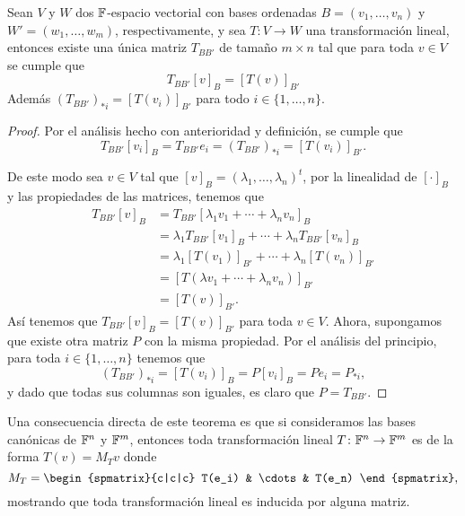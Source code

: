 \begin{teor} \label{teor:MatTrLin}
  Sean $V$ y $W$ dos $\mathbb{F}$-espacio vectorial con bases ordenadas $B = (v_1,\ldots,v_n)$ y $W' = (w_1,\ldots,w_m)$, respectivamente, y sea $T\colon V \to W$ una transformación lineal, entonces existe una única matriz $T_{BB'}$ de tamaño $m\times n$ tal que para toda $v \in V$ se cumple que
    \[ T_{BB'} [v]_B = [T(v)]_{B'} \]
  Además $(T_{BB'})_{*i} = [T(v_i)]_{B'}$ para todo $i \in \{1,\ldots,n\}$.
\end{teor}
\begin{proof}
  Por el análisis hecho con anterioridad y definición, se cumple que
  \[ T_{BB'} [v_i]_B = T_{BB'} e_i = (T_{BB'})_{*i} = [T(v_i)]_{B'}. \]
  
  De este modo sea $v \in V$ tal que $[v]_B = (\lambda_1,\ldots,\lambda_n)^t$, por la linealidad de $[\cdot]_B$ y las propiedades de las matrices, tenemos que
  \begin{align*}
    T_{BB'}[v]_B &= T_{BB'}[\lambda_1v_1 + \cdots + \lambda_n v_n]_B \\
      &= \lambda_1 T_{BB'} [v_1]_B + \cdots + \lambda_n T_{BB'} [v_n]_B \\
      &= \lambda_1 [T(v_1)]_{B'} + \cdots + \lambda_n [T(v_n)]_{B'} \\
      &= [T(\lambda v_1  + \cdots + \lambda_n v_n )]_{B'} \\
      &= [T(v)]_{B'}.
  \end{align*}
  Así tenemos que $T_{BB'} [v]_B = [T(v)]_{B'}$ para toda $v \in V$. Ahora, supongamos que existe otra matriz $P$ con la misma propiedad. Por el análisis del principio, para toda $i \in \{1,\ldots,n\}$ tenemos que
  \[ (T_{BB'})_{*i} = [T(v_i)]_B = P[v_i]_B = Pe_i = P_{*i}, \]
  y dado que todas sus columnas son iguales, es claro que $P = T_{BB'}$.
\end{proof}

Una consecuencia directa de este teorema es que si consideramos las bases canónicas de $\mathbb{F}^n$ y $\mathbb{F}^m$, entonces toda transformación lineal $T\colon \mathbb{F}^n \to \mathbb{F}^m$ es de la forma $T(v) = M_T v$ donde
  \[ M_T = \begin{spmatrix}{c|c|c} T(e_i) & \cdots & T(e_n) \end{spmatrix}, \]
mostrando que toda transformación lineal es inducida por alguna matriz.

